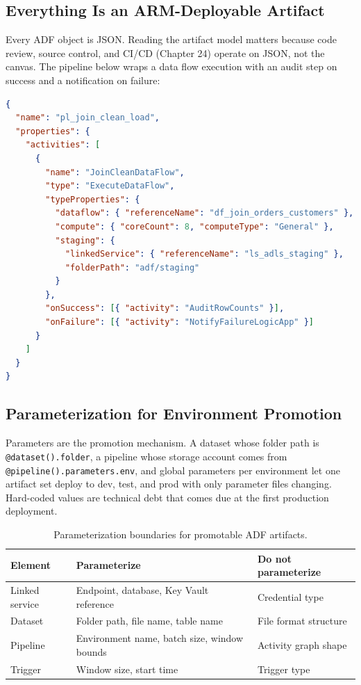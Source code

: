 
\subsection{Everything Is an ARM-Deployable Artifact}
Every ADF object is JSON. Reading the artifact model matters because code review, source control, and CI/CD (Chapter 24) operate on JSON, not the canvas. The pipeline below wraps a data flow execution with an audit step on success and a notification on failure:

\begin{lstlisting}[language=json,caption={Pipeline JSON: execute a data flow, audit on success, notify on failure.},label={lst:ch10-pipeline-json}]
{
  "name": "pl_join_clean_load",
  "properties": {
    "activities": [
      {
        "name": "JoinCleanDataFlow",
        "type": "ExecuteDataFlow",
        "typeProperties": {
          "dataflow": { "referenceName": "df_join_orders_customers" },
          "compute": { "coreCount": 8, "computeType": "General" },
          "staging": {
            "linkedService": { "referenceName": "ls_adls_staging" },
            "folderPath": "adf/staging"
          }
        },
        "onSuccess": [{ "activity": "AuditRowCounts" }],
        "onFailure": [{ "activity": "NotifyFailureLogicApp" }]
      }
    ]
  }
}
\end{lstlisting}

\subsection{Parameterization for Environment Promotion}
Parameters are the promotion mechanism. A dataset whose folder path is \texttt{@dataset().folder}, a pipeline whose storage account comes from \texttt{@pipeline().parameters.env}, and global parameters per environment let one artifact set deploy to dev, test, and prod with only parameter files changing. Hard-coded values are technical debt that comes due at the first production deployment.

\begin{table}[H]
\centering
\small
\begin{tabular}{@{}p{3.2cm}p{4.9cm}p{5.4cm}@{}}
\toprule
\textbf{Element} & \textbf{Parameterize} & \textbf{Do not parameterize} \\
\midrule
Linked service & Endpoint, database, Key Vault reference & Credential type \\
Dataset & Folder path, file name, table name & File format structure \\
Pipeline & Environment name, batch size, window bounds & Activity graph shape \\
Trigger & Window size, start time & Trigger type \\
\bottomrule
\end{tabular}
\caption{Parameterization boundaries for promotable ADF artifacts.}
\label{tab:ch10-parameterization}
\end{table}

